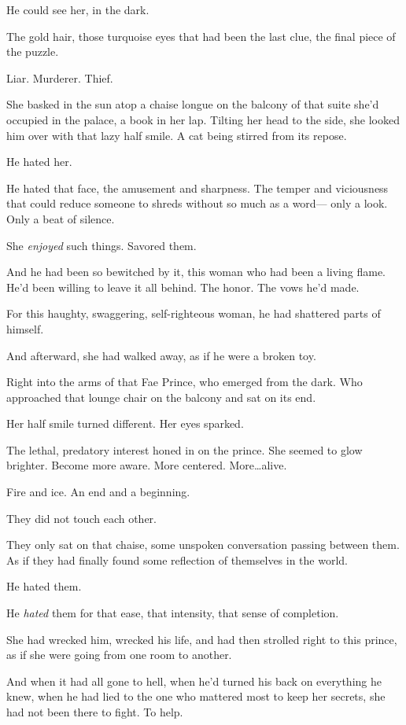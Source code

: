 He could see her, in the dark.

The gold hair, those turquoise eyes that had been the last clue, the final piece of the puzzle.

Liar.
Murderer.
Thief.

She basked in the sun atop a chaise longue on the balcony of that suite she'd occupied in the palace, a book in her lap.
Tilting her head to the side, she looked him over with that lazy half smile.
A cat being stirred from its repose.

He hated her.

He hated that face, the amusement and sharpness.
The temper and viciousness that could reduce someone to shreds without so much as a word--- only a look.
Only a beat of silence.

She \emph{enjoyed} such things.
Savored them.

And he had been so bewitched by it, this woman who had been a living flame.
He'd been willing to leave it all behind.
The honor.
The vows he'd made.

For this haughty, swaggering, self-righteous woman, he had shattered parts of himself.

And afterward, she had walked away, as if he were a broken toy.

Right into the arms of that Fae Prince, who emerged from the dark.
Who approached that lounge chair on the balcony and sat on its end.

Her half smile turned different.
Her eyes sparked.

The lethal, predatory interest honed in on the prince.
She seemed to glow brighter.
Become more aware.
More centered.
More\ldots alive.

Fire and ice.
An end and a beginning.

They did not touch each other.

They only sat on that chaise, some unspoken conversation passing between them.
As if they had finally found some reflection of themselves in the world.

He hated them.

He \emph{hated} them for that ease, that intensity, that sense of completion.

She had wrecked him, wrecked his life, and had then strolled right to this prince, as if she were going from one room to another.

And when it had all gone to hell, when he'd turned his back on everything he knew, when he had lied to the one who mattered most to keep her secrets, she had not been there to fight.
To help.

